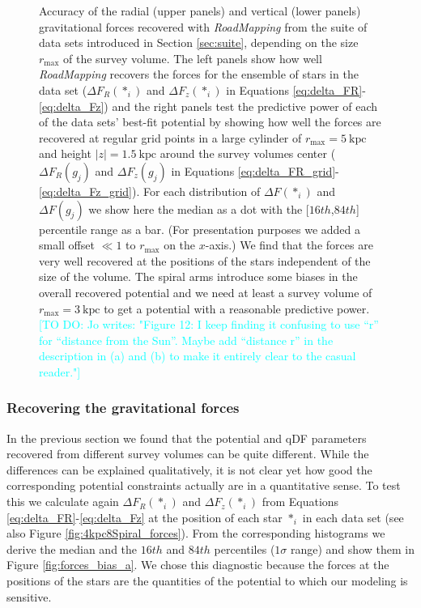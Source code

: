 \documentclass[iop,revtex4,numberedappendix,appendixfloats]{emulateapj}
\newcommand{\RM}{{\sl RoadMapping}}
\newcommand{\Jo}[1]{\textcolor{Cyan}{#1}}
\begin{document}
\begin{figure}[!htbp]
\caption{Accuracy of the radial (upper panels) and vertical (lower panels) gravitational forces recovered with \RM{} from the suite of data sets introduced in Section \ref{sec:suite}, depending on the size $r_\text{max}$ of the survey volume. The left panels show how well \RM{} recovers the forces for the ensemble of stars in the data set ($\Delta F_{R}(*_i)$ and $\Delta F_{z}(*_i)$ in Equations \eqref{eq:delta_FR}-\eqref{eq:delta_Fz}) and the right panels test the predictive power of each of the data sets' best-fit potential by showing how well the forces are recovered at regular grid points in a large cylinder of $r_\text{max}=5~\text{kpc}$ and height $|z|=1.5~\text{kpc}$ around the survey volumes center ($\Delta F_{R}(g_j)$ and $\Delta F_{z}(g_j)$ in Equations \eqref{eq:delta_FR_grid}-\eqref{eq:delta_Fz_grid}). For each distribution of $\Delta F(*_i)$ and $\Delta F(g_j)$ we show here the median as a dot with the  [$16th$,$84th$] percentile range as a bar. (For presentation purposes we added a small offset $\ll 1$ to $r_\text{max}$ on the $x$-axis.) We find that the forces are very well recovered at the positions of the stars independent of the size of the volume. The spiral arms introduce some biases in the overall recovered potential and we need at least a survey volume of $r_\text{max}=3~\text{kpc}$ to get a potential with a reasonable predictive power. \Jo{[TO DO: Jo writes: "Figure 12: I keep finding it confusing to use “r” for “distance from the Sun”. Maybe add “distance r” in the description in (a) and (b) to make it entirely clear to the casual reader."]}}
\label{fig:forces_bias}
\end{figure}


\subsubsection{Recovering the gravitational forces}\label{sec:forces_bias}

In the previous section we found that the potential and qDF parameters recovered from different survey volumes can be quite different. While the differences can be explained qualitatively, it is not clear yet how good the corresponding potential constraints actually are in a quantitative sense. To test this we calculate again $\Delta F_R(*_i)$ and $\Delta F_z(*_i)$ from Equations \eqref{eq:delta_FR}-\eqref{eq:delta_Fz} at the position of each star $*_i$ in each data set (see also Figure \ref{fig:4kpc8Spiral_forces}). From the corresponding histograms we derive the median and the $16th$ and $84th$ percentiles ($1\sigma$ range) and show them in Figure \ref{fig:forces_bias_a}. We chose this diagnostic because the forces at the positions of the stars are the quantities of the potential to which our modeling is sensitive.
\end{document}
